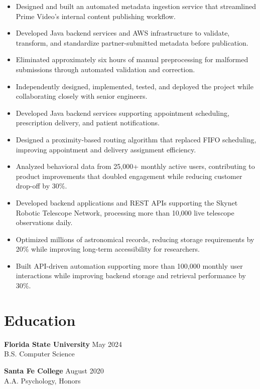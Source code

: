 \documentclass[10pt,letterpaper]{article}
\begin{document}
\vspace{3pt}


\begin{itemize}
\item Designed and built an automated metadata ingestion service that streamlined Prime Video's internal content publishing workflow.
\item Developed Java backend services and AWS infrastructure to validate, transform, and standardize partner-submitted metadata before publication.
\item Eliminated approximately six hours of manual preprocessing for malformed submissions through automated validation and correction.
\item Independently designed, implemented, tested, and deployed the project while collaborating closely with senior engineers.
\end{itemize}

\vspace{3pt}


\begin{itemize}
\item Developed Java backend services supporting appointment scheduling, prescription delivery, and patient notifications.
\item Designed a proximity-based routing algorithm that replaced FIFO scheduling, improving appointment and delivery assignment efficiency.
\item Analyzed behavioral data from 25,000+ monthly active users, contributing to product improvements that doubled engagement while reducing customer drop-off by 30\%.
\end{itemize}

\vspace{3pt}


\begin{itemize}
\item Developed backend applications and REST APIs supporting the Skynet Robotic Telescope Network, processing more than 10,000 live telescope observations daily.
\item Optimized millions of astronomical records, reducing storage requirements by 20\% while improving long-term accessibility for researchers.
\item Built API-driven automation supporting more than 100,000 monthly user interactions while improving backend storage and retrieval performance by 30\%.
\end{itemize}

\section*{Education}

\textbf{Florida State University} \hfill May 2024 \\
B.S. Computer Science

\vspace{3pt}

\textbf{Santa Fe College} \hfill August 2020  \\
A.A. Psychology, Honors
\end{document}
